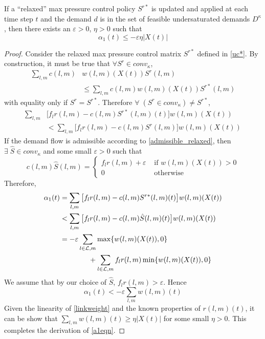  \begin{Lem} \label{alpha1bound}
If a ``relaxed'' max pressure control policy $S^{r*}$ is updated and applied at each time step $t$ and the demand $d$ is in the set of feasible undersaturated demands $D^\kappa$, then there exists an $\varepsilon>0$, $\eta>0$ such that 
\begin{equation} \label{a1eqn} 
\alpha_1(t)  \leq -\varepsilon \eta \big| X(t)\big| 
\end{equation}
\end{Lem}
\begin{proof}
Consider the relaxed max pressure control matrix $S^{r*}$ defined in \eqref{uc*}. By construction, it must be true that $ \forall S^r \in conv_{\kappa}$, 
\begin{align} \nonumber
\sum_{l,m}c(l,m)& w(l,m)(X(t))S^r (l,m) \\
&\leq \sum_{l,m}c(l,m)w(l,m)(X(t))S^{r*}(l,m) 
\end{align}
with equality only if $S^r = S^{r*}$. 
Therefore $\forall \; (S^r  \in conv_{\kappa}) \neq S^{r*}$,
\begin{align} \nonumber
 \sum_{l,m}&\big[f_{l}r(l,m) - c(l,m)S^{r*}(l,m)(t)\big]w(l,m)(X(t)) \\
&<   \sum_{l,m}\big[f_{l}r(l,m) - c(l,m)S^r(l,m)\big]w(l,m)(X(t))
\end{align}
If the demand flow is admissible according to \eqref{admissible_relaxed}, then 
$\exists \; \hat{S} \in conv_{\kappa}$ and some small $\varepsilon>0$ such that 
\begin{equation} \nonumber
c(l,m)\hat{S} (l,m) = \begin{cases}
        f_{l}r(l,m) + \varepsilon & \text{ if } w(l,m)(X(t)) > 0 \\
        0 & \text{ otherwise}
    \end{cases}
\end{equation}
Therefore, 
\begin{align} \nonumber
 \alpha_1(t) &= \sum_{l,m}\big[f_{l}r(l,m) -  c(l,m)S^{r*}(l,m)(t)\big] w(l,m)(X(t))  \\ \nonumber
 &< \sum_{l,m}\big[f_{l}r(l,m) -  c(l,m)\hat{S}(l,m)(t)\big] w(l,m)(X(t)) \\ 
&  = -\varepsilon \sum_{l \in \mathcal{L},m} \max\{w(l,m)(X(t)) ,0\} \\ \nonumber
&\qquad \qquad +  \sum_{l \in \mathcal{L},m}  f_l r(l,m)  \min\{ w(l,m)(X(t)) ,0\}
\end{align}
We assume that by our choice of $\hat{S}$, $f_{l}r(l,m) > \varepsilon$. Hence
\begin{equation} 
\alpha_1(t) < -\varepsilon \sum_{l,m}w(l,m)(t)
\end{equation}
Given the linearity of \eqref{linkweight} and the known properties of $r(l,m)(t)$, it can be show that $\sum_{l,m}w(l,m)(t) \geq \eta |X(t)|$ for some small $\eta >0$. This completes the derivation of \eqref{a1eqn}.
\end{proof}


